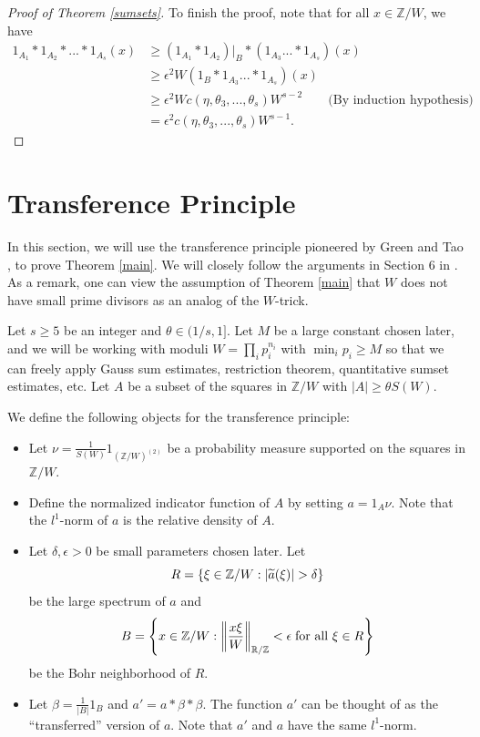 \documentclass[11pt]{amsart}
\theoremstyle{plain} %
\theoremstyle{remark}
\numberwithin{equation}{section}
\newcommand{\R}{\mathbb{R}}
\newcommand{\Z}{\mathbb{Z}}
\DeclarePairedDelimiter\abs{\lvert}{\rvert}
\DeclarePairedDelimiter\norm{\lVert}{\rVert}
\begin{document}
\begin{proof}[Proof of Theorem \ref{sumsets}]
    To finish the proof, note that for all $x\in \Z/W$, we have
    \begin{equation*}
        \begin{split}
            1_{A_1}*1_{A_2}*...*1_{A_s}(x)&\geq (1_{A_1}*1_{A_2})|_B*(1_{A_3}...*1_{A_s})(x)\\
            &\geq \epsilon^2 W (1_B*1_{A_3}...*1_{A_s})(x)\\
            &\geq \epsilon^2 W c(\eta,\theta_3,...,\theta_s)W^{s-2}\quad\quad\text{(By induction hypothesis)}\\
            &=\epsilon^2 c(\eta,\theta_3,...,\theta_s)W^{s-1}.
        \end{split}
    \end{equation*}
\end{proof}


\section{Transference Principle}\label{sec: transference principle}

In this section, we will use the transference principle pioneered by Green and Tao \cite{Green}, \cite{GreenTao} to prove Theorem \ref{main}. We will closely follow the arguments in Section 6 in \cite{Green}. As a remark, one can view the assumption of Theorem \ref{main} that $W$ does not have small prime divisors as an analog of the $W$-trick.

Let $s\geq 5$ be an integer and $\theta\in (1/s,1]$. Let $M$ be a large constant chosen later, and we will be working with moduli $W=\prod_i p_i^{n_i}$ with $\min_i p_i\geq M$ so that we can freely apply Gauss sum estimates, restriction theorem, quantitative sumset estimates, etc. Let $A$ be a subset of the squares in $\Z/W$ with $|A|\geq \theta S(W)$.

We define the following objects for the transference principle:
\begin{itemize}
    \item Let $\nu=\frac{1}{S(W)}1_{(\Z/W)^{(2)}}$ be a probability measure supported on the squares in $\Z/W$.
    \item Define the normalized indicator function of $A$ by setting $a=1_A \nu$. Note that the $l^1$-norm of $a$ is the relative density of $A$.
    \item Let $\delta,\epsilon>0$ be small parameters chosen later. Let
    \begin{equation*}
        R=\{\xi\in \Z/W:\abs{\widetilde{a}(\xi)}>\delta\}
    \end{equation*}
    be the large spectrum of $a$ and 
    \begin{equation*}
        B=\left\{x\in \Z/W:\norm[\bigg]{\frac{x\xi}{W}}_{\R/\Z}<\epsilon\;\text{for all $\xi\in R$}\right\}
    \end{equation*}
    be the Bohr neighborhood of $R$.
    \item Let $\beta=\frac{1}{|B|}1_B$ and $a'=a*\beta*\beta$. The function $a'$ can be thought of as the ``transferred'' version of $a$. Note that $a'$ and $a$ have the same $l^1$-norm.
\end{itemize}
\end{document}
